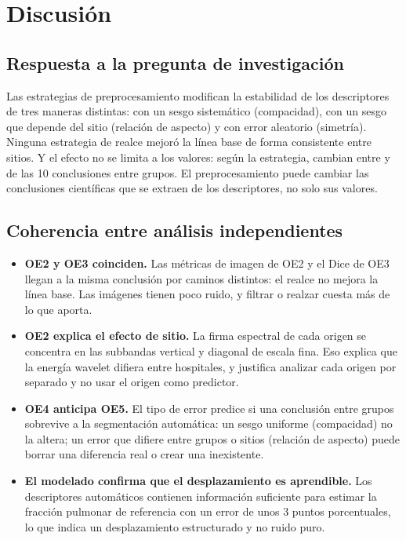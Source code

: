 ﻿\section{Discusión}

\subsection{Respuesta a la pregunta de investigación}

Las estrategias de preprocesamiento modifican la estabilidad de los descriptores
de tres maneras distintas: con un sesgo sistemático (compacidad), con un sesgo que
depende del sitio (relación de aspecto) y con error aleatorio (simetría). Ninguna
estrategia de realce mejoró la línea base de forma consistente entre sitios. Y el
efecto no se limita a los valores: según la estrategia, cambian entre
\FinDiscMin{} y \FinDiscMax{} de las 10 conclusiones entre grupos. El
preprocesamiento puede cambiar las conclusiones científicas que se extraen de los
descriptores, no solo sus valores.

\subsection{Coherencia entre análisis independientes}

\begin{itemize}
    \item \textbf{OE2 y OE3 coinciden.} Las métricas de imagen de OE2 y el Dice de
    OE3 llegan a la misma conclusión por caminos distintos: el realce no mejora la
    línea base. Las imágenes tienen poco ruido, y filtrar o realzar cuesta más de
    lo que aporta.
    \item \textbf{OE2 explica el efecto de sitio.} La firma espectral de cada origen
    se concentra en las subbandas vertical y diagonal de escala fina. Eso explica
    que la energía wavelet difiera entre hospitales, y justifica analizar cada
    origen por separado y no usar el origen como predictor.
    \item \textbf{OE4 anticipa OE5.} El tipo de error predice si una conclusión
    entre grupos sobrevive a la segmentación automática: un sesgo uniforme
    (compacidad) no la altera; un error que difiere entre grupos o sitios
    (relación de aspecto) puede borrar una diferencia real o crear una inexistente.
    \item \textbf{El modelado confirma que el desplazamiento es aprendible.} Los
    descriptores automáticos contienen información suficiente para estimar la
    fracción pulmonar de referencia con un error de unos 3 puntos porcentuales, lo
    que indica un desplazamiento estructurado y no ruido puro.
\end{itemize}

